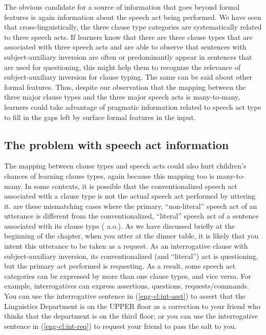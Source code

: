 The obvious candidate for a source of information that goes beyond formal features is again information about the speech act being performed. We have seen that cross-linguistically, the three clause type categories are systematically related to three speech acts. If learners know that there are three clause types that are associated with three speech acts and are able to observe that sentences with subject-auxiliary inversion are often or predominantly appear in sentences that are used for questioning, this might help them to recognize the relevance of subject-auxiliary inversion for clause typing. The same can be said about other formal features. Thus, despite our observation that the mapping between the three major clause types and the three major speech acts is many-to-many, learners could take advantage of pragmatic information related to speech act type to fill in the gaps left by surface formal features in the input. 

\subsection{The problem with speech act information}
The mapping between clause types and speech acts could also hurt children's chances of learning clause types, again because this mapping too is many-to-many. In some contexts, it is possible that the conventionalized speech act associated with a clause type is not the actual speech act performed by uttering it.  are these mismatching cases where the primary, ``non-literal'' speech act of an utterance is different from the conventionalized, ``literal'' speech act of a sentence associated with its clause type (\citealt{searle1975tax, searle1976class, bachharnish1979, searlevanderveken1985, portner2004, starr2014, portner2018, murraystarr2020} a.o.). As we have discussed briefly at the beginning of the chapter,  when you utter  at the dinner table, it is likely that you intent this utterance to be taken as a request. As an interrogative clause with subject-auxiliary inversion, its conventionalized (and ``literal'') act is questioning, but the primary act performed is requesting. As a result, some speech act categories can be expressed by more than one clause types, and vice versa. For example, interrogatives can express assertions, questions, requests/commands. You can use the interrogative sentence in (\ref{eng-cl:int-asst}) to assert that the Linguistics Department is on the UPPER floor as a correction to your friend who thinks that the department is on the third floor; or you can use the interrogative sentence in (\ref{eng-cl:int-req}) to request your friend to pass the salt to you.

